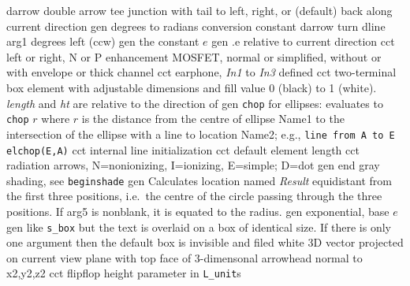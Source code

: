   {darrow}
  {double arrow tee junction with tail to left,
   right, or (default) back along current direction }
  {gen}
  {degrees to radians conversion constant}
  {darrow}
  {turn dline arg1 degrees left (ccw)}
%
  {gen}
  {the constant $e$}
  {gen}
  {.e relative to current direction}
  {cct}
  {left or right, N or P enhancement MOSFET, normal
   or simplified, without or with envelope or thick channel 
    }
  {cct}
  {earphone, {\sl In1} to {\sl In3} defined
   }
  {cct}
  { two-terminal box element with adjustable dimensions and fill
   value 0 (black) to 1 (white). {\sl length} and {\sl ht} are relative
   to the direction of \linespec{}}
  {gen}
  {{\tt chop} for ellipses: evaluates to {\tt chop} $r$ where $r$ is
    the distance from the centre of ellipse Name1 to the intersection of
    the ellipse with a line to location Name2;
    e.g., {\tt line from A to E elchop(E,A)}}
  {cct}
  {internal line initialization}
  {cct}
  {default element length}
  {cct}
  {radiation arrows, N=nonionizing, I=ionizing, E=simple;
     D=dot}
  {gen}
  {end gray shading, see {\tt beginshade}}
  {gen}
  {Calculates location named {\sl Result} equidistant from the first three
   positions, i.e.\ the centre of the circle passing through the three
   positions.  If arg5 is nonblank, it is equated to the radius.}
  {gen}
  {exponential, base $e$}
%
  {gen}
  {like {\tt s\_box} but the text is overlaid on a box of identical size.
   If there is only one argument then the default box
   is invisible and filed white
    }
  {3D}
  {vector projected on current view plane with top face
   of 3-dimensonal arrowhead normal to x2,y2,z2 }
  {cct}
  {flipflop height parameter in {\tt L\_unit}s}

